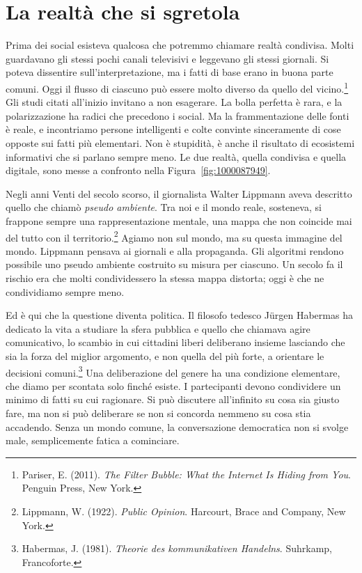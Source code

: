 \section{La realtà che si sgretola}

Prima dei social esisteva qualcosa che potremmo chiamare realtà condivisa. Molti guardavano gli stessi pochi canali televisivi e leggevano gli stessi giornali. Si poteva dissentire sull'interpretazione, ma i fatti di base erano in buona parte comuni. Oggi il flusso di ciascuno può essere molto diverso da quello del vicino.\footnote{Pariser, E. (2011). \textit{The Filter Bubble: What the Internet Is Hiding from You}. Penguin Press, New York.} Gli studi citati all'inizio invitano a non esagerare. La bolla perfetta è rara, e la polarizzazione ha radici che precedono i social. Ma la frammentazione delle fonti è reale, e incontriamo persone intelligenti e colte convinte sinceramente di cose opposte sui fatti più elementari. Non è stupidità, è anche il risultato di ecosistemi informativi che si parlano sempre meno. Le due realtà, quella condivisa e quella digitale, sono messe a confronto nella Figura~\ref{fig:1000087949}.



Negli anni Venti del secolo scorso, il giornalista Walter Lippmann aveva descritto quello che chiamò \textit{pseudo ambiente}. Tra noi e il mondo reale, sosteneva, si frappone sempre una rappresentazione mentale, una mappa che non coincide mai del tutto con il territorio.\footnote{Lippmann, W. (1922). \textit{Public Opinion}. Harcourt, Brace and Company, New York.} Agiamo non sul mondo, ma su questa immagine del mondo. Lippmann pensava ai giornali e alla propaganda. Gli algoritmi rendono possibile uno pseudo ambiente costruito su misura per ciascuno. Un secolo fa il rischio era che molti condividessero la stessa mappa distorta; oggi è che ne condividiamo sempre meno.

Ed è qui che la questione diventa politica. Il filosofo tedesco Jürgen Habermas ha dedicato la vita a studiare la sfera pubblica e quello che chiamava agire comunicativo, lo scambio in cui cittadini liberi deliberano insieme lasciando che sia la forza del miglior argomento, e non quella del più forte, a orientare le decisioni comuni.\footnote{Habermas, J. (1981). \textit{Theorie des kommunikativen Handelns}. Suhrkamp, Francoforte.} Una deliberazione del genere ha una condizione elementare, che diamo per scontata solo finché esiste. I partecipanti devono condividere un minimo di fatti su cui ragionare. Si può discutere all'infinito su cosa sia giusto fare, ma non si può deliberare se non si concorda nemmeno su cosa stia accadendo. Senza un mondo comune, la conversazione democratica non si svolge male, semplicemente fatica a cominciare.

